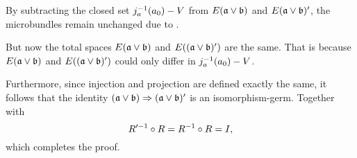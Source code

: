 \begin{myproof}
\begin{sectionize}
        By subtracting the closed set $j_a^{-1}(a_0) - V$
        from $E(\ba \vee \bb)$ and $E(\ba \vee \bb)'$,
        the microbundles remain unchanged due to .
        
        But now the total spaces $E(\ba \vee \bb)$ and $E((\ba \vee \bb)')$ are the same.
        That is because $E(\ba \vee \bb)$ and $E((\ba \vee \bb)')$
        could only differ in $j_a^{-1}(a_0) - V$.

        
        Furthermore, since injection and projection are defined exactly the same,
        it follows that the identity $\germ{(\ba \vee \bb)}{(\ba \vee \bb)'}$
        is an isomorphism-germ.
        Together with
        \[ R'^{-1} \circ R = R^{-1} \circ R = I, \]
        which completes the proof.
    \end{sectionize}
\end{myproof}